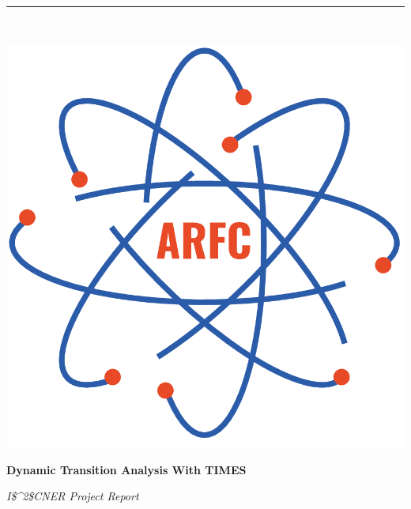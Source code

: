 \documentclass[14pt,a4paper]{article} %
\begin{document}

\begin{titlepage} %
    \newcommand{\HRule}{\rule{\linewidth}{0.5mm}} %
    
    \center %

    
    \HRule\\[0.2cm]
    
     \begin{minipage}{0.4\textwidth}
        \includegraphics[width=\textwidth]{arfc-logo}
        \end{minipage}%
        \begin{minipage}{0.6\textwidth}
        {\begin{flushright}\huge\bfseries Dynamic Transition Analysis With \gls{TIMES} \end{flushright}}
        {\begin{flushright}\large\textit{\gls{I$^2$CNER}  Project Report}\end{flushright}}


\end{minipage}
\end{titlepage}
\end{document}
